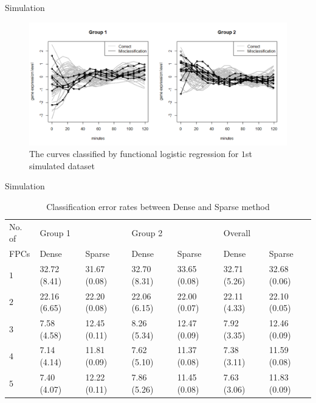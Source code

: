 \documentclass{beamer}
\begin{document}
\begin{frame}{Simulation}
	\begin{figure}[h] %
		\begin{center}
			\includegraphics[width=1\linewidth]{img/2.png}
		\end{center}
		\label{fig:long}
		\label{fig:onecol}
		\caption{The curves classified by functional logistic regression for $1$st simulated dataset}
	\end{figure}
\end{frame}

\begin{frame}{Simulation}
	\begin{table}[ht]
		\caption{Classification error rates between Dense and Sparse method}
		\centering
		\tiny
		\begin{tabular}{lllllll}
			\hline
			No. of & \multicolumn{2}{l}{Group 1} & \multicolumn{2}{l}{Group 2} & \multicolumn{2}{l}{Overall} \\
			FPCs   & Dense & Sparse & Dense & Sparse & Dense & Sparse \\
			\hline
			$1$ & 32.72 (8.41) & 31.67 (0.08) & 32.70 (8.31) & 33.65 (0.08) & 32.71 (5.26) & 32.68 (0.06) \\
			$2$ & 22.16 (6.65) & 22.20 (0.08) & 22.06 (6.15) & 22.00 (0.07) & 22.11 (4.33) & 22.10 (0.05) \\
			$3$ &  7.58 (4.58) & 12.45 (0.11) &  8.26 (5.34) & 12.47 (0.09) &  7.92 (3.35) & 12.46 (0.09) \\
			$4$ &  7.14 (4.14) & 11.81 (0.09) &  7.62 (5.10) & 11.37 (0.08) &  7.38 (3.11) & 11.59 (0.08) \\
			$5$ &  7.40 (4.07) & 12.22 (0.11) &  7.86 (5.26) & 11.45 (0.08) &  7.63 (3.06) & 11.83 (0.09) \\
			\hline
		\end{tabular}
	\end{table}
\end{frame}
\end{document}
